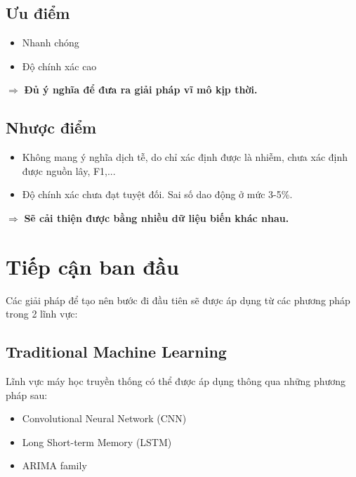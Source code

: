 ﻿\documentclass{article}
\begin{document}
\begin{multicols}{2}

\subsection{Ưu điểm}
\begin{itemize}
    \item Nhanh chóng
    \item Độ chính xác cao
\end{itemize}

$\Rightarrow$ \textbf{Đủ ý nghĩa để đưa ra giải pháp vĩ mô kịp thời.}
\columnbreak

\subsection{Nhược điểm}
\begin{itemize}
    \item Không mang ý nghĩa dịch tễ, do chỉ xác định được là nhiễm, chưa xác định được nguồn lây, F1,...
    \item Độ chính xác chưa đạt tuyệt đối. Sai số dao động ở mức 3-5\%.
\end{itemize}

$\Rightarrow$ \textbf{Sẽ cải thiện được bằng nhiều dữ liệu biến khác nhau.}
\end{multicols}

\pagebreak

\section{Tiếp cận ban đầu}

Các giải pháp để tạo nên bước đi đầu tiên sẽ được áp dụng từ các phương pháp trong 2 lĩnh vực:

\subsection{Traditional Machine Learning}

Lĩnh vực máy học truyền thống có thể được áp dụng thông qua những phương pháp sau:

\begin{itemize}
    \item Convolutional Neural Network (CNN)
    \item Long Short-term Memory (LSTM)
    \item ARIMA family
\end{itemize}
\end{document}
